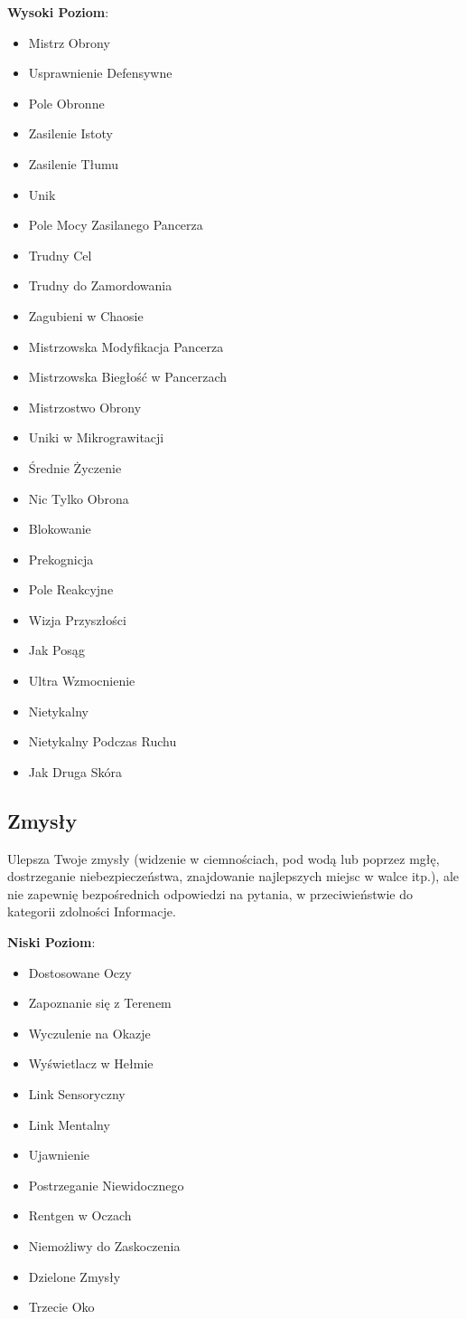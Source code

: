 \textbf{Wysoki Poziom}:

\begin{itemize}
\item Mistrz Obrony
\item Usprawnienie Defensywne
\item Pole Obronne
\item Zasilenie Istoty
\item Zasilenie Tłumu
\item Unik
\item Pole Mocy Zasilanego Pancerza
\item Trudny Cel
\item Trudny do Zamordowania
\item Zagubieni w Chaosie
\item Mistrzowska Modyfikacja Pancerza
\item Mistrzowska Biegłość w Pancerzach
\item Mistrzostwo Obrony
\item Uniki w Mikrograwitacji
\item Średnie Życzenie
\item Nic Tylko Obrona
\item Blokowanie
\item Prekognicja
\item Pole Reakcyjne
\item Wizja Przyszłości
\item Jak Posąg
\item Ultra Wzmocnienie
\item Nietykalny
\item Nietykalny Podczas Ruchu
\item Jak Druga Skóra
\end{itemize}

\subsection{Zmysły}

Ulepsza Twoje zmysły (widzenie w ciemnościach, pod wodą lub poprzez mgłę, dostrzeganie niebezpieczeństwa, znajdowanie najlepszych miejsc w walce itp.), ale nie zapewnię bezpośrednich odpowiedzi na pytania, w przeciwieństwie do kategorii zdolności Informacje.

\textbf{Niski Poziom}:

\begin{itemize}
\item Dostosowane Oczy
\item Zapoznanie się z Terenem
\item Wyczulenie na Okazje
\item Wyświetlacz w Hełmie
\item Link Sensoryczny
\item Link Mentalny
\item Ujawnienie
\item Postrzeganie Niewidocznego
\item Rentgen w Oczach
\item Niemożliwy do Zaskoczenia
\item Dzielone Zmysły
\item Trzecie Oko
\end{itemize}

